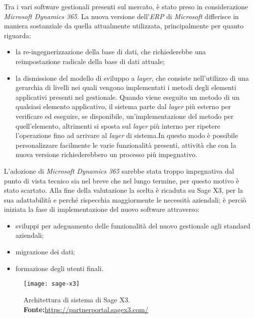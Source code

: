 Tra i vari software gestionali presenti sul mercato, è stato preso in considerazione \textit{Microsoft Dynamics 365}. La nuova versione dell'\textit{ERP} di \textit{Microsoft} differisce in maniera sostanziale da quella attualmente utilizzata, principalmente per quanto riguarda:
\begin{itemize}
	\item la re-ingegnerizzazione della base di dati, che richiederebbe una reimpostazione radicale della base di dati attuale;
	\item la dismissione del modello di sviluppo a \textit{layer}, che consiste nell'utilizzo di una gerarchia di livelli nei quali vengono implementati i metodi degli elementi applicativi presenti nel gestionale. Quando viene eseguito un metodo di un qualsiasi elemento applicativo, il sistema parte dal \textit{layer} più esterno per verificare ed eseguire, se disponibile, un'implementazione del metodo per quell'elemento, altrimenti si sposta sul \textit{layer} più interno per ripetere l'operazione fino ad arrivare al \textit{layer} di sistema.In questo modo è possibile personalizzare facilmente le varie funzionalità presenti, attività che con la nuova versione richiederebbero un processo più impegnativo.
\end{itemize}
L'adozione di \textit{Microsoft Dynamics 365} sarebbe stata troppo impegnativa dal punto di vista tecnico sia nel breve che nel lungo termine, per questo motivo è stato scartato.
Alla fine della valutazione la scelta è ricaduta su Sage X3, per la sua adattabilità e perché rispecchia maggiormente le necessità aziendali; è perciò iniziata la fase di implementazione del nuovo software attraverso:

\begin{itemize}
	\item sviluppi per adeguamento delle funzionalità del nuovo gestionale agli standard aziendali;
	\item migrazione dei dati;
	\item formazione degli utenti finali.
\end{itemize}


\vspace{10pt}
\begin{figure}[htbp]
	\begin{center}
		\texttt{[image: sage-x3]}
		\caption{Architettura di sistema di Sage X3. \newline \textbf{Fonte:}\url{https://partnerportal.sagex3.com/}}
	\end{center}
\end{figure}
\vspace{30pt}


